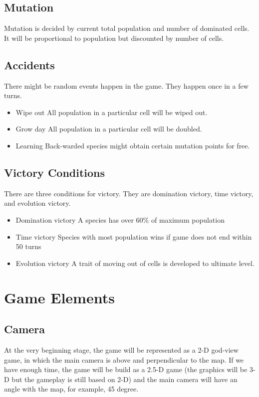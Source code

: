 \documentclass[12pt,a4paper]{article}
\begin{document}
\subsection{Mutation}
Mutation is decided by current total population and number of dominated cells. It will be proportional to population but discounted by number of cells.

\subsection{Accidents}
There might be random events happen in the game. They happen once in a few turns.
\begin{itemize}
\item Wipe out
All population in a particular cell will be wiped out.
\item Grow day
All population in a particular cell will be doubled.
\item Learning
Back-warded species might obtain certain mutation points for free.

\end{itemize}
\subsection{Victory Conditions}
There are three conditions for victory. They are domination victory, time victory, and evolution victory.
\begin{itemize}
\item Domination victory
A species has over 60\% of maximum population
\item Time victory
Species with most population wins if game does not end within 50 turns
\item Evolution victory
A trait of moving out of cells is developed to ultimate level.
\end{itemize}
\section{Game Elements}

\subsection{Camera}
At the very beginning stage, the game will be represented as a 2-D god-view game, in which the main camera is above and perpendicular to the map. If we have enough time, the game will be build as a 2.5-D game (the graphics will be 3-D but the gameplay is still based on 2-D) and the main camera will have an angle with the map, for example, 45 degree. 
\end{document}
